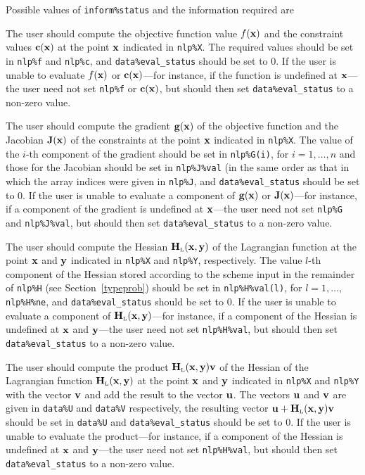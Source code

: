 \documentclass{galahad}
\newcommand{\bmHL}{\bmH\sub{L}}
\begin{document}
Possible values of {\tt inform\%status} and the information required are
\begin{description}
 The user should compute the objective function value $f({\mathbf{x}})$ 
     and the constraint values ${\mathbf{c}}({\mathbf{x}})$ at the point ${\mathbf{x}}$ indicated 
     in {\tt nlp\%X}.
     The required values should be set in {\tt nlp\%f} and {\tt nlp\%c}, and
     {\tt data\%eval\_status} should be set to 0. If the user is
     unable to evaluate $f({\mathbf{x}})$ or ${\mathbf{c}}({\mathbf{x}})$---for instance, if the 
     function is undefined at ${\mathbf{x}}$---the user need not set {\tt nlp\%f}
     or ${\mathbf{c}}({\mathbf{x}})$, but
     should then set {\tt data\%eval\_status} to a non-zero value.

 The user should compute the gradient ${\mathbf{g}}({\mathbf{x}})$ of the 
     objective function and the Jacobian ${\mathbf{J}}({\mathbf{x}})$ of the constraints
     at the point ${\mathbf{x}}$ indicated in {\tt nlp\%X}.
     The value of the $i$-th component of the gradient should be set
     in {\tt nlp\%G(i)}, for $i = 1, \ldots, n$ and those for the
     Jacobian should be set in  {\tt nlp\%J\%val}
     (in the same order as that in which the array indices were given 
     in {\tt nlp\%J},  and {\tt data\%eval\_status} should be set to 0. 
     If the user is unable to evaluate a component of ${\mathbf{g}}({\mathbf{x}})$ or 
     ${\mathbf{J}}({\mathbf{x}})$---for  instance, if a component of the gradient is
     undefined at ${\mathbf{x}}$---the user need not set {\tt nlp\%G} and 
     {\tt nlp\%J\%val}, but  should then set {\tt data\%eval\_status} 
     to a non-zero value.

 The user should compute the Hessian $\bmHL(\bmx,\bmy)$
     of the Lagrangian function at the point ${\mathbf{x}}$ and ${\mathbf{y}}$
     indicated in {\tt nlp\%X} and {\tt nlp\%Y}, respectively.
     The value $l$-th component of the Hessian stored according to the
     scheme input in the remainder of {\tt nlp\%H} (see Section~\ref{typeprob})
     should be set in {\tt nlp\%H\%val(l)}, for $l = 1, \ldots,$ 
     {\tt nlp\%H\%ne}, and {\tt data\%eval\_status} should be set to 0. 
     If the user is  unable to evaluate a component of $\bmHL(\bmx,\bmy)$---for
     instance, if a component of the Hessian is
     undefined at ${\mathbf{x}}$ and ${\mathbf{y}}$---the user need not set
     {\tt nlp\%H\%val}, but should then set {\tt data\%eval\_status} 
     to a non-zero value.

 The user should compute the product $\bmHL(\bmx,\bmy) \bmv$ of the 
     Hessian of the Lagrangian function $\bmHL(\bmx,\bmy)$ at the point 
     ${\mathbf{x}}$ and ${\mathbf{y}}$ indicated in {\tt nlp\%X}  and {\tt nlp\%Y} with the 
     vector ${\mathbf{v}}$ and add the result to
     the vector ${\mathbf{u}}$. The vectors ${\mathbf{u}}$ and ${\mathbf{v}}$ are given in
     {\tt data\%U} and {\tt data\%V} respectively, the resulting
     vector $\bmu + \bmHL(\bmx,\bmy)\bmv$ should be set in {\tt data\%U}
     and  {\tt data\%eval\_status} should be set to 0. If the user is
     unable to evaluate the product---for instance, if a component of the 
     Hessian is undefined at ${\mathbf{x}}$ and ${\mathbf{y}}$---the user need not set 
    {\tt nlp\%H\%val}, but should then set {\tt data\%eval\_status} to a 
    non-zero value.
\end{description}
\end{document}

